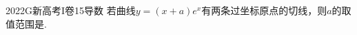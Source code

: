 
\begin{problem}{2022}{G}{新高考I卷}{15}{导数}
若曲线$y=(x+a)e^x$有两条过坐标原点的切线，则$a$的取值范围是\underline{\hspace{4em}}.
\end{problem}

\begin{answer}

\end{answer}

\begin{solutions}

\end{solutions}